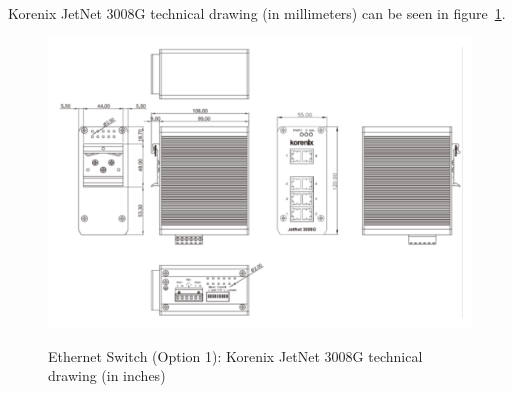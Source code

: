 Korenix JetNet 3008G technical drawing (in millimeters) can be seen in figure~\ref{FIG:DEVICESWITCHOPTION1DRAWING}.
\begin{figure}
  \centering
  \includegraphics[angle=90,width=1\columnwidth]{figs/body02/FIGDEVICESWITCHOPTION1DRAWING.pdf}\\
  \caption[Ethernet Switch (Option 1): Korenix JetNet 3008G technical drawing (in inches)]{Ethernet Switch (Option 1): Korenix JetNet 3008G technical drawing (in inches)}
  \label{FIG:DEVICESWITCHOPTION1DRAWING}
\end{figure}


